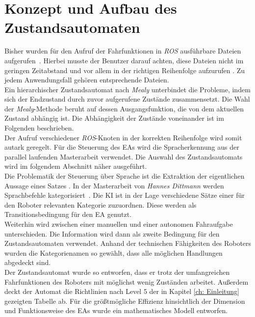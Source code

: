 		
	\section{Konzept und Aufbau des Zustandsautomaten}
	\label{sec: Umsetzung der Statemachine}
	Bisher wurden für den Aufruf der Fahrfunktionen in \textit{ROS} ausführbare Dateien aufgerufen~\cite{Bachelorarbeit}. Hierbei musste der Benutzer darauf achten, diese Dateien nicht im geringen Zeitabstand und vor allem in der richtigen Reihenfolge aufzurufen \cite{Bachelorarbeit}. Zu jedem Anwendungsfall gehören entsprechende Dateien. \\
	
	Ein hierarchischer Zustandsautomat nach \textit{Mealy} unterbindet die Probleme, indem sich der Endzustand durch zuvor aufgerufene Zustände zusammensetzt. Die Wahl der \textit{Mealy}-Methode beruht auf dessen Ausgangsfunktion, die von dem aktuellen Zustand abhängig ist. Die Abhängigkeit der Zustände voneinander ist im Folgenden beschrieben.\\
	
	Der Aufruf verschiedener \textit{ROS}-Knoten in der korrekten Reihenfolge wird somit autark geregelt. Für die Steuerung des EAs wird die Spracherkennung aus der parallel laufenden Masterarbeit verwendet. Die Auswahl des Zustandsautomats wird im folgendem Abschnitt näher ausgeführt.\\	
	
	Die Problematik der Steuerung über Sprache ist die Extraktion der eigentlichen Aussage eines Satzes \cite{Dittmann}. In der Masterarbeit von \textit{Hannes Dittmann} werden Sprachbefehle kategorisiert~\cite{Dittmann}. Die KI ist in der Lage verschiedene Sätze einer für den Roboter relevanten Kategorie zuzuordnen. Diese werden als Transitionsbedingung für den EA genutzt.\\
	
	Weiterhin wird zwischen einer manuellen und einer autonomen Fahraufgabe unterschieden. Die Information wird dann als zweite Bedingung für den Zustandsautomaten verwendet. Anhand der technischen Fähigkeiten des Roboters wurden die Kategorienamen so gewählt, dass alle möglichen Handlungen abgedeckt sind.\\
	
	 Der Zustandsautomat wurde so entworfen, dass er trotz der umfangreichen Fahrfunktionen des Roboters mit möglichst wenig Zuständen arbeitet. Außerdem deckt der Automat die Richtlinien nach Level 5 der in Kapitel \ref{ch: Einleitung} gezeigten Tabelle ab. Für die größtmögliche Effizienz hinsichtlich der Dimension und Funktionsweise des EAs wurde ein mathematisches Modell entworfen.\\
	

